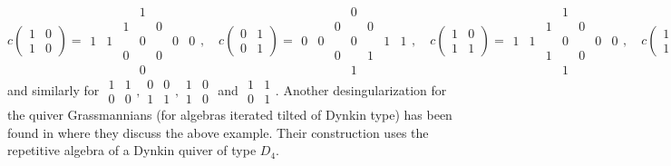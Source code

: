 \documentclass[11pt,a4paper]{amsart}
\theoremstyle{plain}
\theoremstyle{definition}
\begin{document}
\[
{c} \left(\begin{smallmatrix} 1 & 0 \\ 1 & 0 \end{smallmatrix} \right)
=\begin{smallmatrix}
&&& 1 &&&\\
&& 1 && 0 && \\
1 & 1 && 0 && 0 & 0 \\ 
&& 0 && 0 && \\
&&& 0 &&&
\end{smallmatrix}, \quad 
{c} \left(\begin{smallmatrix} 0 & 1 \\ 0 & 1 \end{smallmatrix} \right)
=\begin{smallmatrix}
&&& 0 &&&\\
&& 0 && 0 && \\
0 & 0 && 0 && 1 & 1 \\ 
&& 0 && 1 && \\
&&& 1 &&&
\end{smallmatrix}, \quad 
{c} \left(\begin{smallmatrix} 1 & 0 \\ 1 & 1 \end{smallmatrix} \right)
=\begin{smallmatrix}
&&& 1 &&&\\
&& 1 && 0 && \\
1 & 1 && 0 && 0 & 0 \\ 
&& 1 && 0 && \\
&&& 1 &&&
\end{smallmatrix}, \quad 
{c} \left(\begin{smallmatrix} 1 & 1 \\ 1 & 1 \end{smallmatrix} \right)
=\begin{smallmatrix}
&&& 1 &&&\\
&& 1 && 1 && \\
1 & 1 && 1 && 1 & 1 \\ 
&& 1 && 1 && \\
&&& 1 &&&
\end{smallmatrix} 
\]
and similarly for $\begin{smallmatrix} 1 & 1 \\ 0 & 0 \end{smallmatrix} , \begin{smallmatrix} 0 & 0 \\ 1 & 1 \end{smallmatrix}, \begin{smallmatrix} 1 & 0 \\ 1 & 0 \end{smallmatrix}$ and $\begin{smallmatrix} 1 & 1 \\ 0 & 1 \end{smallmatrix} $.  
Another desingularization for the quiver Grassmannians (for algebras  iterated tilted of Dynkin type) has been found in \cite{KS2} where they discuss the above example. Their construction uses the repetitive algebra of a Dynkin quiver of type $D_4$. 




\end{document}
